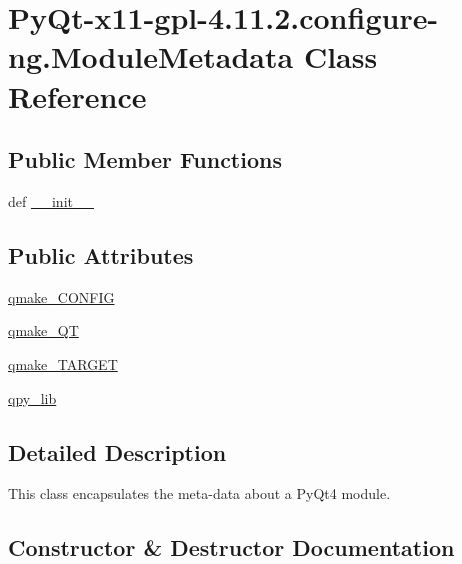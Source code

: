 \hypertarget{classPyQt-x11-gpl-4_811_82_1_1configure-ng_1_1ModuleMetadata}{}\section{Py\+Qt-\/x11-\/gpl-\/4.11.2.configure-\/ng.Module\+Metadata Class Reference}
\label{classPyQt-x11-gpl-4_811_82_1_1configure-ng_1_1ModuleMetadata}
\subsection*{Public Member Functions}
\begin{DoxyCompactItemize}
\item 
def \hyperlink{classPyQt-x11-gpl-4_811_82_1_1configure-ng_1_1ModuleMetadata_aa56360eac5164d3c317f114ef7526be2}{\+\_\+\+\_\+init\+\_\+\+\_\+}
\end{DoxyCompactItemize}
\subsection*{Public Attributes}
\begin{DoxyCompactItemize}
\item 
\hyperlink{classPyQt-x11-gpl-4_811_82_1_1configure-ng_1_1ModuleMetadata_abc4d7caa8d478d3348d2e043f5d00413}{qmake\+\_\+\+C\+O\+N\+F\+I\+G}
\item 
\hyperlink{classPyQt-x11-gpl-4_811_82_1_1configure-ng_1_1ModuleMetadata_a19243d37905eed079d7a2cf0c0303753}{qmake\+\_\+\+Q\+T}
\item 
\hyperlink{classPyQt-x11-gpl-4_811_82_1_1configure-ng_1_1ModuleMetadata_a39ee37141e55cd858cb19665e867ff38}{qmake\+\_\+\+T\+A\+R\+G\+E\+T}
\item 
\hyperlink{classPyQt-x11-gpl-4_811_82_1_1configure-ng_1_1ModuleMetadata_aebe8e6a37ab34315a37e64545c918eab}{qpy\+\_\+lib}
\end{DoxyCompactItemize}


\subsection{Detailed Description}
\begin{DoxyVerb}This class encapsulates the meta-data about a PyQt4 module. \end{DoxyVerb}
 

\subsection{Constructor \& Destructor Documentation}
\hypertarget{classPyQt-x11-gpl-4_811_82_1_1configure-ng_1_1ModuleMetadata_aa56360eac5164d3c317f114ef7526be2}{}
